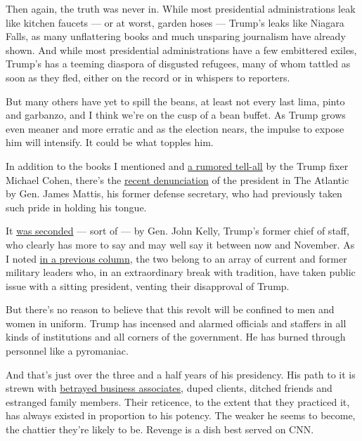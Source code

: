 Then again, the truth was never in. While most presidential
administrations leak like kitchen faucets --- or at worst, garden hoses
--- Trump's leaks like Niagara Falls, as many unflattering books and
much unsparing journalism have already shown. And while most
presidential administrations have a few embittered exiles, Trump's has a
teeming diaspora of disgusted refugees, many of whom tattled as soon as
they fled, either on the record or in whispers to reporters.

But many others have yet to spill the beans, at least not every last
lima, pinto and garbanzo, and I think we're on the cusp of a bean
buffet. As Trump grows even meaner and more erratic and as the election
nears, the impulse to expose him will intensify. It could be what
topples him.

In addition to the books I mentioned and
\href{https://www.thedailybeast.com/michael-cohen-is-writing-a-secret-tell-all-to-spill-the-beans-on-trump}{a
rumored tell-all} by the Trump fixer Michael Cohen, there's the
\href{https://www.theatlantic.com/politics/archive/2020/06/james-mattis-denounces-trump-protests-militarization/612640/}{recent
denunciation} of the president in The Atlantic by Gen. James Mattis, his
former defense secretary, who had previously taken such pride in holding
his tongue.

It
\href{https://www.cbsnews.com/news/john-kelly-trump-military-force-agrees-with-mattis/}{was
seconded} --- sort of --- by Gen. John Kelly, Trump's former chief of
staff, who clearly has more to say and may well say it between now and
November. As I noted
\href{https://www.nytimes3xbfgragh.onion/2020/06/15/opinion/trump-military.html}{in
a previous column}, the two belong to an array of current and former
military leaders who, in an extraordinary break with tradition, have
taken public issue with a sitting president, venting their disapproval
of Trump.

But there's no reason to believe that this revolt will be confined to
men and women in uniform. Trump has incensed and alarmed officials and
staffers in all kinds of institutions and all corners of the government.
He has burned through personnel like a pyromaniac.

And that's just over the three and a half years of his presidency. His
path to it is strewn with
\href{https://www.wsj.com/articles/donald-trumps-business-plan-left-a-trail-of-unpaid-bills-1465504454}{betrayed
business associates}, duped clients, ditched friends and estranged
family members. Their reticence, to the extent that they practiced it,
has always existed in proportion to his potency. The weaker he seems to
become, the chattier they're likely to be. Revenge is a dish best served
on CNN.

